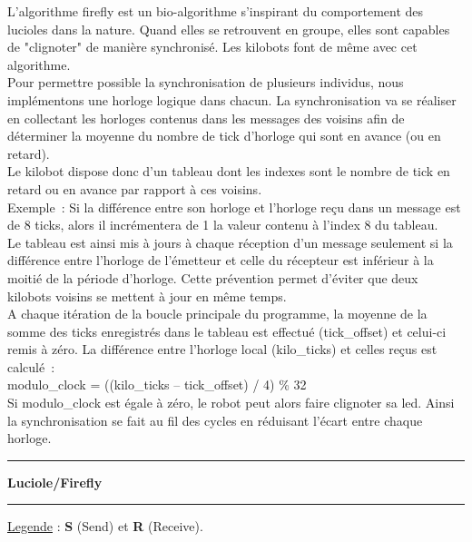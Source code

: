 \documentclass[a4paper,8pt]{report}
\begin{document}
L'algorithme firefly est un bio-algorithme s'inspirant du comportement des lucioles dans la nature. Quand elles se retrouvent en groupe, elles sont capables de "clignoter" de manière synchronisé.
Les kilobots font de même avec cet algorithme.\\

Pour permettre possible la synchronisation de plusieurs individus, nous implémentons une horloge logique dans chacun. La synchronisation va se réaliser en collectant les horloges contenus dans les messages des voisins afin de déterminer la moyenne du nombre de tick d'horloge qui sont en avance (ou en retard).\\

Le kilobot dispose donc d'un tableau dont les indexes sont le nombre de tick en retard ou en avance par rapport à ces voisins.\\
Exemple : Si la différence entre son horloge et l'horloge reçu dans un message est de 8 ticks, alors il incrémentera de 1 la valeur contenu à l'index 8 du tableau.\\
Le tableau est ainsi mis à jours à chaque réception d'un message seulement si la différence entre l'horloge de l’émetteur et celle du récepteur est inférieur à la moitié de la période d'horloge. Cette prévention permet d'éviter que deux kilobots voisins se mettent à jour en même temps.\\

A chaque itération de la boucle principale du programme, la moyenne de la somme des ticks enregistrés dans le tableau est effectué (tick\_offset) et celui-ci remis à zéro. La différence entre l'horloge local (kilo\_ticks) et celles reçus est calculé :\\

modulo\_clock = ((kilo\_ticks – tick\_offset) / 4) \% 32\\

Si modulo\_clock est égale à zéro, le robot peut alors faire clignoter sa led. 
Ainsi la synchronisation se fait au fil des cycles en réduisant l'écart entre chaque horloge.

\begin{center}
  \rule{\linewidth}{.5pt}
  \textbf{Luciole/Firefly}\\
  \rule{\linewidth}{.5pt}
\end{center}
\underline{Legende} : \textbf{S} (Send) et \textbf{R} (Receive).\\
\end{document}
